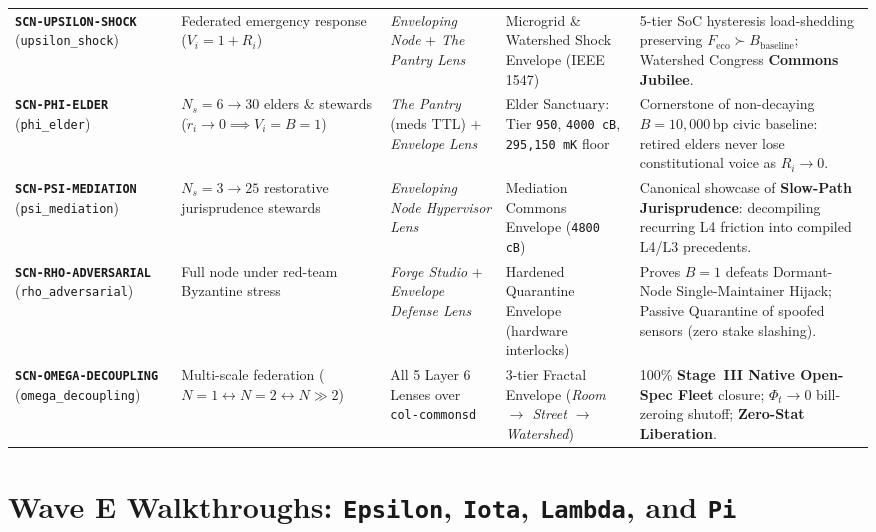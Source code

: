 \begin{table}[htbp]
{\begin{tabular}{@{}lllll@{}}
\textbf{\texttt{SCN-UPSILON-SHOCK}} (\texttt{upsilon\_shock}) & Federated emergency response ($V_i = 1+R_i$) & \textit{Enveloping Node} + \textit{The Pantry Lens} & Microgrid \& Watershed Shock Envelope (IEEE 1547) & 5-tier SoC hysteresis load-shedding preserving $F_{\mathrm{eco}} \succ B_{\mathrm{baseline}}$; Watershed Congress \textbf{Commons Jubilee}. \\
\textbf{\texttt{SCN-PHI-ELDER}} (\texttt{phi\_elder}) & $N_s = 6 \to 30$ elders \& stewards ($\dot{r}_i \to 0 \implies V_i = B = 1$) & \textit{The Pantry} (meds TTL) + \textit{Envelope Lens} & Elder Sanctuary: Tier \texttt{950}, \texttt{4000 cB}, \texttt{295,150 mK} floor & Cornerstone of non-decaying $B=10{,}000\,\mathrm{bp}$ civic baseline: retired elders never lose constitutional voice as $R_i \to 0$. \\
\textbf{\texttt{SCN-PSI-MEDIATION}} (\texttt{psi\_mediation}) & $N_s = 3 \to 25$ restorative jurisprudence stewards & \textit{Enveloping Node Hypervisor Lens} & Mediation Commons Envelope (\texttt{4800 cB}) & Canonical showcase of \textbf{Slow-Path Jurisprudence}: decompiling recurring L4 friction into compiled L4/L3 precedents. \\
\textbf{\texttt{SCN-RHO-ADVERSARIAL}} (\texttt{rho\_adversarial}) & Full node under red-team Byzantine stress & \textit{Forge Studio} + \textit{Envelope Defense Lens} & Hardened Quarantine Envelope (hardware interlocks) & Proves $B=1$ defeats Dormant-Node Single-Maintainer Hijack; Passive Quarantine of spoofed sensors (zero stake slashing). \\
\textbf{\texttt{SCN-OMEGA-DECOUPLING}} (\texttt{omega\_decoupling}) & Multi-scale federation ($N=1 \leftrightarrow N=2 \leftrightarrow N \gg 2$) & All 5 Layer 6 Lenses over \texttt{col-commonsd} & 3-tier Fractal Envelope (\textit{Room $\to$ Street $\to$ Watershed}) & 100\% \textbf{Stage~III Native Open-Spec Fleet} closure; $\Phi_t \to 0$ bill-zeroing shutoff; \textbf{Zero-Stat Liberation}. \\
\bottomrule
\end{tabular}%
}
\end{table}

\section{Wave E Walkthroughs: \texttt{Epsilon}, \texttt{Iota}, \texttt{Lambda}, and \texttt{Pi}}
\label{sec:ch13-wave-e}

